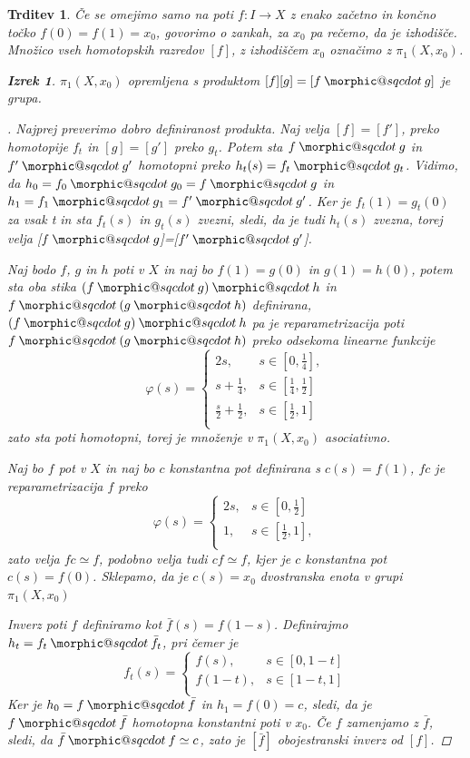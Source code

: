 \documentclass[a4paper,12pt]{article}
\makeatletter
\DeclareRobustCommand{\sqcdot}{\mathbin{\mathpalette\morphic@sqcdot\relax}}
\newcommand{\morphic@sqcdot}[2]{%
\sbox\z@{$\m@th#1\centerdot$}%
\ht\z@=.33333\ht\z@
\vcenter{\box\z@}%
}
\theoremstyle{definition}
\theoremstyle{plain}
\newtheorem{izrek}{Izrek}
\theoremstyle{definition}
\theoremstyle{plain}
\newtheorem{trditev}{Trditev}
\theoremstyle{plain}
\theoremstyle{plain}
\theoremstyle{plain}
\newenvironment{dokaz}{\begin{proof}[\bfseries\upshape\proofname]}{\end{proof}}
\makeatother
\begin{document}
\begin{trditev}
Če se omejimo samo na poti $f:I \rightarrow X$ z enako začetno in končno točko $f(0) = f(1) = x_0$, govorimo o zankah, za $x_0$ pa rečemo, da je izhodišče.
Množico vseh homotopskih razredov $[f]$, z izhodiščem $x_0$ označimo z $\pi_1(X,x_0)$.

\begin{izrek}
    $\pi_1(X,x_0)$ opremljena s produktom $[f][g] = [f\sqcdot g]$ je grupa.
\end{izrek}

\begin{dokaz}
    Najprej preverimo dobro definiranost produkta. Naj velja $[f]=[f']$, preko homotopije $f_t$ in $[g]=[g']$ preko $g_t$. Potem sta $f\sqcdot g$ in $f'\sqcdot g'$ homotopni preko
    $h_t(s) =f_t \sqcdot g_t$. Vidimo, da $h_0=f_0 \sqcdot g_0=f \sqcdot g$ in $h_1=f_1 \sqcdot g_1=f'\sqcdot g'$. Ker je $f_t(1)=g_t(0)$ za vsak t in sta $f_t(s)$ in $g_t(s)$ zvezni, sledi, da je tudi $h_t(s)$ zvezna, torej velja [$f\sqcdot g$]=[$f'\sqcdot g'$].

    Naj bodo $f$, $g$ in $h$ poti v $X$ in naj bo $f(1)=g(0)$ in 
    $g(1)=h(0)$, potem sta oba stika $(f\sqcdot g) \sqcdot h$ in 
    $f\sqcdot (g \sqcdot h)$ definirana, $(f\sqcdot g) \sqcdot h$ pa je
     reparametrizacija poti $f\sqcdot (g \sqcdot h)$ preko odsekoma linearne 
     funkcije
    $$
    \varphi(s)=\begin{cases}
        2s, & s \in [0,\frac{1}{4}],\\
        s+\frac{1}{4}, & s \in [\frac{1}{4},\frac{1}{2}]\\
        \frac{s}{2}+\frac{1}{2}, &s \in [\frac{1}{2},1] \\
    \end{cases}
    $$ zato sta poti homotopni, torej je množenje v $\pi_1(X,x_0)$ asociativno.

    Naj bo $f$ pot v $X$ in naj bo $c$ konstantna pot definirana s $c(s)=f(1)$, $fc$ je reparametrizacija $f$ preko 
    $$\varphi(s)=\begin{cases}
        2s, &s \in [0,\frac{1}{2}] \\
        1, & s \in [\frac{1}{2},1],\\
        \end{cases}
    $$zato velja $fc\simeq f$, podobno velja tudi  $cf\simeq f$, kjer je $c$ konstantna pot $c(s)=f(0)$. Sklepamo, da je $c(s)=x_0$ dvostranska enota v grupi  $\pi_1(X,x_0)$

    Inverz poti $f$ definiramo kot $\bar{f}(s)=f(1-s)$. Definirajmo $h_t=f_t\sqcdot \bar{f_t}$, pri čemer je 
    $$
    f_t(s)=
    \begin{cases}
        f(s), &s \in [0,1-t] \\
        f(1-t), & s \in [1-t,1] \\
        \end{cases}
$$
Ker je $h_0=f\sqcdot \bar{f}$ in $h_1=f(0)=c$, sledi, da je $f\sqcdot \bar{f}$ homotopna konstantni poti v $x_0$. Če $f$ zamenjamo z $\bar{f}$, sledi, da $\bar{f}\sqcdot f\simeq c$, zato je $[\bar{f}]$ obojestranski inverz od $[f]$.
\end{dokaz}


\end{trditev}
\end{document}
